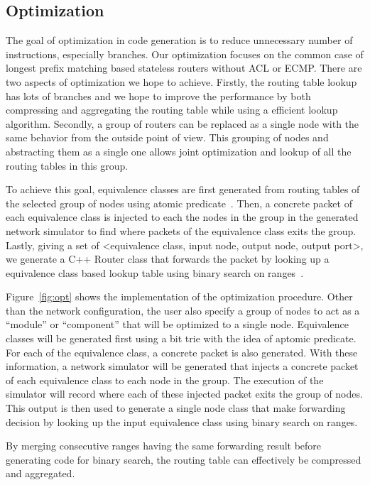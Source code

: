 \documentclass[letterpaper, 10 pt, conference]{ieeeconf}  %
\begin{document}
\subsection{Optimization}\label{sec:opt}
The goal of optimization in code generation is to reduce unnecessary number of instructions, especially branches. Our optimization focuses on the common case of longest prefix matching based stateless routers without ACL or ECMP. There are two aspects of optimization we hope to achieve. Firstly, the routing table lookup has lots of branches and we hope to improve the performance by both compressing and aggregating the routing table while using a efficient lookup algorithm. Secondly, a group of routers can be replaced as a single node with the same behavior from the outside point of view. This grouping of nodes and abstracting them as a single one allows joint optimization and lookup of all the routing tables in this group.

To achieve this goal, equivalence classes are first generated from routing tables of the selected group of nodes using atomic predicate~\cite{ap}. Then, a concrete packet of each equivalence class is injected to each the nodes in the group in the generated network simulator to find where packets of the equivalence class exits the group. Lastly, giving a set of <equivalence class, input node, output node, output port>, we generate a C++ Router class that forwards the packet by looking up a equivalence class based lookup table using binary search on ranges~\cite{binary_search_lookup}.

Figure~\ref{fig:opt} shows the implementation of the optimization procedure. Other than the network configuration, the user also specify a group of nodes to act as a ``module'' or ``component'' that will be optimized to a single node. Equivalence classes will be generated first using a bit trie with the idea of aptomic predicate. For each of the equivalence class, a concrete packet is also generated. With these information, a network simulator will be generated that injects a concrete packet of each equivalence class to each node in the group. The execution of the simulator will record where each of these injected packet exits the group of nodes. This output is then used to generate a single node class that make forwarding decision by looking up the input equivalence class using binary search on ranges.

By merging consecutive ranges having the same forwarding result before generating code for binary search, the routing table can effectively be compressed and aggregated.
\end{document}
